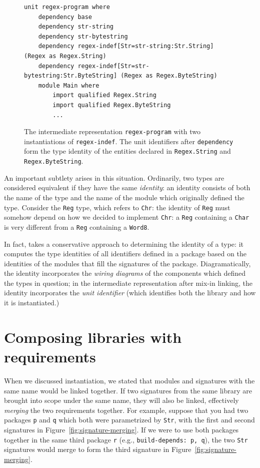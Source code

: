 \begin{figure}
\begin{lstlisting}
unit regex-program where
    dependency base
    dependency str-string
    dependency str-bytestring
    dependency regex-indef[Str=str-string:Str.String] (Regex as Regex.String)
    dependency regex-indef[Str=str-bytestring:Str.ByteString] (Regex as Regex.ByteString)
    module Main where
        import qualified Regex.String
        import qualified Regex.ByteString
        ...
\end{lstlisting}
\caption{The intermediate representation \texttt{regex-program} with two instantiations of \texttt{regex-indef}.  The unit identifiers after \texttt{dependency} form the type identity of the entities declared in \texttt{Regex.String} and \texttt{Regex.ByteString}.}
\label{fig:matcher-twice-bkp}
\end{figure}

An important subtlety arises in this situation.  Ordinarily, two types
are considered equivalent if they have the same \emph{identity}: an
identity consists of both the name of the type and the name of the
module which originally defined the type.  Consider the \verb|Reg| type,
which refers to \verb|Chr|: the identity of \verb|Reg| must somehow
depend on how we decided to implement \verb|Chr|: a \verb|Reg|
containing a \verb|Char| is very different from a \verb|Reg| containing
a \verb|Word8|.

In fact, \Backpack{} takes a conservative approach to determining the
identity of a type: it computes the type identities of all identifiers
defined in a package based on the identities of the modules that fill
the signatures of the package.  Diagramatically, the identity
incorporates the \emph{wiring diagrams} of the components which defined
the types in question; in the intermediate representation after mix-in
linking, the identity incorporates the \emph{unit identifier} (which
identifies both the library and how it is instantiated.)

\section{Composing libraries with requirements}

When we discussed instantiation, we stated that modules and signatures
with the same name would be linked together.  If two signatures from the
same library are brought into scope under the same name, they will also
be linked, effectively \emph{merging} the two requirements together.
For example, suppose that you had two packages \verb|p| and \verb|q|
which both were parametrized by \verb|Str|, with the first and second
signatures in Figure~\ref{fig:signature-merging}.  If we were to use
both packages together in the same third package \verb|r| (e.g.,
\verb|build-depends: p, q|), the two \verb|Str| signatures would merge
to form the third signature in Figure~\ref{fig:signature-merging}.

